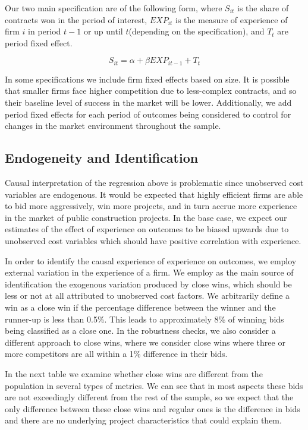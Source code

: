 Our two main specification are of the following form, where $S_{it }$ is the share of contracts won in the period of interest, $EXP_{it} $ is the measure of experience of firm $i$ in period $t-1$ or up until $t$(depending on the specification), and $T_t$ are period fixed effect.

$$S_{it}=\alpha+ \beta EXP_{it-1}+T_t$$

In some specifications we include firm fixed effects based on size. It is possible that smaller firms face higher competition due to less-complex contracts, and so their baseline level of success in the market will be lower. Additionally, we add period  fixed effects for each period of outcomes being considered to control for changes in the market environment throughout the sample.

\subsection{Endogeneity and Identification}
Causal interpretation of the regression above is problematic since unobserved cost variables are endogenous. It would be expected that highly efficient firms are able to bid more aggressively, win more projects, and in turn accrue more experience in the market of public construction projects. In the base case, we expect our estimates of the effect of experience on outcomes to be biased upwards due to unobserved cost variables which should have positive correlation with experience.

In order to identify the causal experience of experience on outcomes, we employ external variation in the experience of a firm. We employ as the main source of identification the exogenous variation produced by close wins, which should be less or not at all attributed to unobserved cost factors. We arbitrarily define a win as a close win if the percentage difference between the winner and the runner-up is less than 0.5\%. This leads to approximately 8\% of winning bids being classified as a close one.  In the robustness checks, we also consider a different approach to close wins, where we consider close wins where three or more competitors are all within a 1\% difference in their bids.

In the next table we examine whether close wins are different from the population in several types of metrics. We can see that in most aspects these bids are not exceedingly different from the rest of the sample, so we expect that the only difference between these close wins and regular ones is the difference in bids and there are no underlying project characteristics that could explain them.

